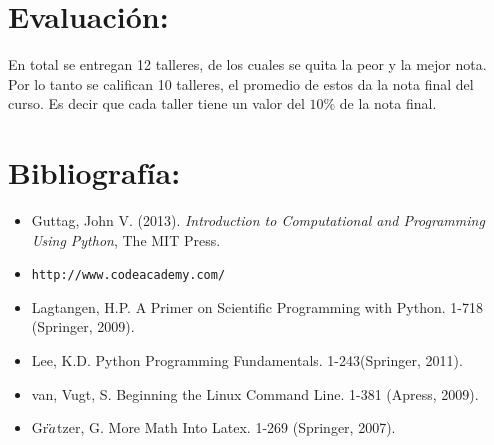 \documentclass[letterpaper]{article}
\begin{document}
\section*{Evaluaci\'on:}

En total se entregan 12 talleres, de los cuales se quita la peor y la mejor nota. 
Por lo tanto se califican 10 talleres, el promedio de estos da la nota final del curso. Es decir que 
cada taller tiene un valor del $10\%$ de la nota final.

\section*{Bibliograf\'ia:}
\begin{itemize}
\item Guttag, John V. (2013). \textit{Introduction to Computational and Programming Using Python}, The MIT Press.
\item \verb"http://www.codeacademy.com/"
\item Lagtangen, H.P. A Primer on Scientific Programming with Python. 1-718 (Springer, 2009).
\item Lee, K.D. Python Programming Fundamentals. 1-243(Springer, 2011).
\item van, Vugt, S. Beginning the Linux Command Line. 1-381 (Apress, 2009).
\item Gr$\ddot \rm{a}$tzer, G. More Math Into Latex. 1-269 (Springer, 2007).
\end{itemize}
\end{document}
